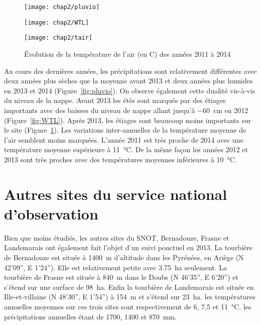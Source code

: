 \begin{figure}
\centering
\texttt{[image: chap2/pluvio]}\\
\caption{Évolution du niveau de la pluviométrie, en \si{\mm}, des années 2011 à 2014}
\label{fig:pluvio}
\texttt{[image: chap2/WTL]}\\
\caption{Évolution du niveau de la nappe, en cm par rapport à la surface, des années 2011 à 2014}
\label{fig:WTL}
\texttt{[image: chap2/tair]}
\caption{Évolution de la température de l'air (en \textdegree C) des années 2011 à 2014}
\label{fig:tair}
\end{figure}

Au cours des dernières années, les précipitations sont relativement différentes avec deux années plus sèches que la moyenne avant 2013 et deux années plus humides en 2013 et 2014 (Figure~\ref{fig:pluvio}).
On observe également cette dualité vis-à-vis du niveau de la nappe.
Avant 2013 les étés sont marqués par des étiages importants avec des baisses du niveau de nappe allant jusqu'à \SI{-60}{\cm} en 2012 (Figure~\ref{fig:WTL}).
Après 2013, les étiages sont beaucoup moins importants sur le site (Figure~\ref{fig:tair}).
Les variations inter-annuelles de la température moyenne de l'air semblent moins marquées.
L'année 2011 est très proche de 2014 avec une température moyenne supérieure à \SI{11}{\degreeCelsius}.
De la même façon les années 2012 et 2013 sont très proches avec des températures moyennes inférieures à  \SI{10}{\degreeCelsius}.


\section{Autres sites du service national d'observation}

Bien que moins étudiés, les autres sites du SNOT, Bernadouze, Frasne et Landemarais ont également fait l'objet d'un suivi ponctuel en 2013.
La tourbière de Bernadouze est située à \SI{1400}{\metre} d'altitude dans les Pyrénées, en Ariège (N 42’09”, E 1’24”).
Elle est relativement petite avec \SI{3.75}{\hectare} seulement.
La tourbière de Frasne est située à \SI{840}{\metre} dans le Doubs (N 46’35”, E 6’20”) et s'étend sur une surface de \SI{98}{\hectare}.
Enfin la tourbière de Landemarais est située en Ille-et-villaine (N 48’30”, E 1’54”) à \SI{154}{\metre} et s'étend sur \SI{23}{\hectare}.
les températures annuelles moyennes sur ces trois sites sont respectivement de 6, 7,5 et \SI{11}{\degreeCelsius}.
les précipitations annuelles étant de \num{1700}, \num{1400} et \SI{870}{\milli\meter}.

